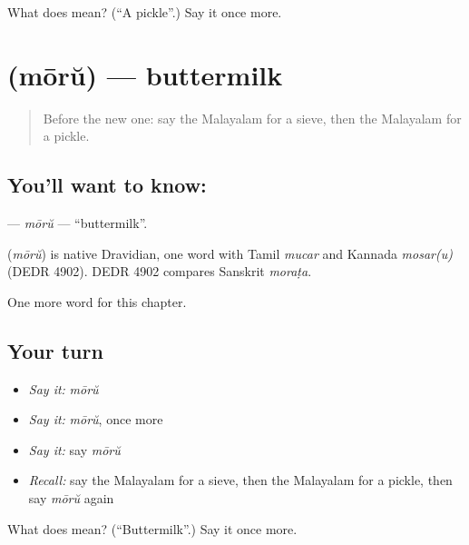 \begin{tcolorbox}[breakable,colback=teal!4,colframe=teal!35!black,title={Before you move on}]
What does  mean? (\textquotedblleft{}A pickle\textquotedblright{}.) Say it once more.
\end{tcolorbox}
\section[\texorpdfstring{\ml{മോര്} (mōrŭ)}{മോര് (mōrŭ)}]{ (mōrŭ) — buttermilk}

\label{lesson:ML-C208-moru}



\begin{quote}
Before the new one: say the Malayalam for a sieve, then the Malayalam for a pickle.
\end{quote}

\subsection*{You'll want to know: }
\textbf{} — \emph{mōrŭ} — \textquotedblleft{}buttermilk\textquotedblright{}.

\begin{cousinweb}
\textbf{} (\emph{mōrŭ}) is native Dravidian, one word with Tamil \emph{mucar} and Kannada \emph{mosar(u)} (DEDR 4902). DEDR 4902 compares Sanskrit \emph{moraṭa}.
\end{cousinweb}

\begin{grammarlens}[title={What you've built}]
One more word for this chapter.
\end{grammarlens}

\subsection*{Your turn}
\begin{itemize}
\raggedright
  \item \emph{Say it:} \emph{mōrŭ}
  \item \emph{Say it:} \emph{mōrŭ}, once more
  \item \emph{Say it:} say \emph{mōrŭ}
  \item \emph{Recall:} say the Malayalam for a sieve, then the Malayalam for a pickle, then say \emph{mōrŭ} again
\end{itemize}

\begin{tcolorbox}[breakable,colback=teal!4,colframe=teal!35!black,title={Before you move on}]
What does  mean? (\textquotedblleft{}Buttermilk\textquotedblright{}.) Say it once more.
\end{tcolorbox}
